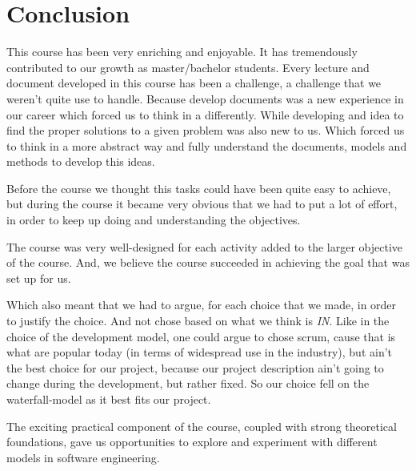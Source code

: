 \renewcommand{\headrulewidth}{0.1pt}
\renewcommand{\footrulewidth}{0.1pt}

\section*{Conclusion} 


This course has been very enriching and enjoyable. It has tremendously contributed to our growth as master/bachelor students. Every lecture and document developed in this course has been a challenge, a challenge that we weren’t quite use to handle. Because develop documents was a new experience in our career which forced us to think in a differently. While developing and idea to find the proper solutions to a given problem was also new to us. Which forced us to think in a more abstract way and fully understand the documents, models and methods to develop this ideas.


Before the course we thought this tasks could have been quite easy to achieve, but during the course it became very obvious that we had to put a lot of effort, in order to keep up doing and understanding the objectives.


The course was very well-designed for each activity added to the larger objective of the course. And, we believe the course succeeded in achieving the goal that was set up for us.


Which also meant that we had to argue, for each choice that we made, in order to justify the choice. And not chose based on what we think is \textit{IN}. Like in the choice of the development model, one could argue to chose scrum, cause that is what are popular today (in terms of widespread use in the industry), but ain’t the best choice for our project, because our project description ain’t going to change during the development, but rather fixed. So our choice fell on the waterfall-model as it best fits our project.


The exciting practical component of the course, coupled with strong theoretical foundations, gave us opportunities to explore and experiment with different models in software engineering.

